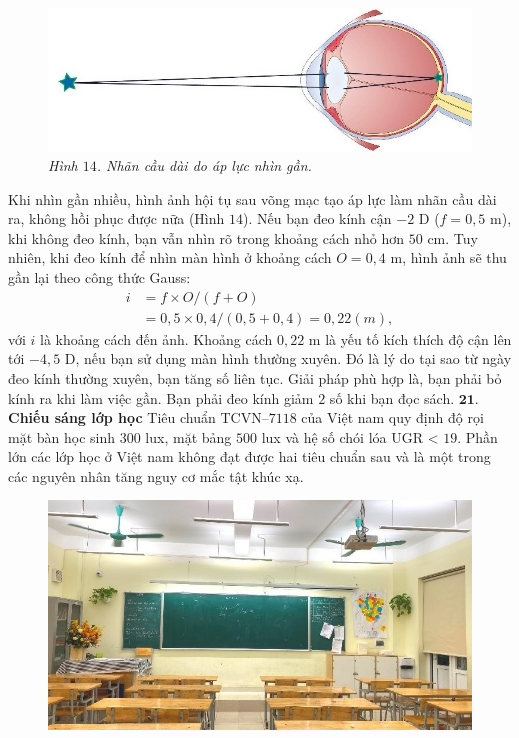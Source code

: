 \begin{multicols}{2}
\begin{figure}[H]
		\centering
		\captionsetup{labelformat= empty, justification=centering}
		\includegraphics[width= 1\linewidth]{14}
		\caption{\small\textit{\color{timhieukhoahoc}Hình $14$. Nhãn cầu dài do áp lực nhìn gần.}}
		\vspace*{-10pt}
	\end{figure}
	Khi nhìn gần nhiều, hình ảnh hội tụ sau võng mạc tạo áp lực làm nhãn cầu dài ra, không hồi phục được nữa (Hình $14$). Nếu bạn đeo kính cận $-2$ D ($f=0{,}5$ m), khi không đeo kính, bạn vẫn nhìn rõ trong khoảng cách nhỏ hơn $50$ cm. Tuy nhiên, khi đeo kính để nhìn màn hình ở khoảng cách $O=0{,}4$ m, hình ảnh sẽ thu gần lại theo công thức Gauss: 
	\begin{align*}
		i&=f\times O/(f+O) \\
		&= 0{,}5\times 0{,}4/(0,5+0,4) = 0,22 (m),
	\end{align*}
	với $i$ là khoảng cách đến ảnh. 
	Khoảng cách $0{,}22$ m là yếu tố kích thích độ cận lên tới $-4{,}5$ D, nếu bạn sử dụng màn hình thường xuyên. Đó là lý do tại sao từ ngày đeo kính thường xuyên, bạn tăng số liên tục.
	\vskip 0.1cm
	Giải pháp phù hợp là, bạn phải bỏ kính ra khi làm việc gần. Bạn phải đeo kính giảm $2$ số khi bạn đọc sách. 
	\vskip 0.1cm
	$\pmb{21.}$ \textbf{\color{timhieukhoahoc}Chiếu sáng lớp học}
	\vskip 0.1cm
	Tiêu chuẩn TCVN--$7118$ của Việt nam quy định độ rọi mặt bàn học sinh $300$ lux, mặt bảng $500$ lux và hệ số chói lóa UGR < $19$. Phần lớn các lớp học ở Việt nam không đạt được hai tiêu chuẩn sau và là một trong các nguyên nhân tăng nguy cơ mắc tật khúc xạ.
	\begin{figure}[H]
		\vspace*{5pt}
		\centering
		\captionsetup{labelformat= empty, justification=centering}
		\includegraphics[width= 1\linewidth]{15}

\end{figure}
\end{multicols}
